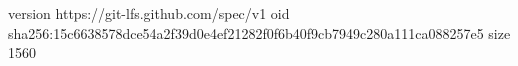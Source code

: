 version https://git-lfs.github.com/spec/v1
oid sha256:15c6638578dce54a2f39d0e4ef21282f0f6b40f9cb7949c280a111ca088257e5
size 1560
